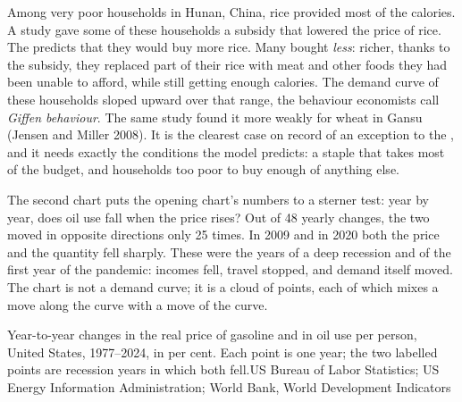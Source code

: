 \begin{record}
Among very poor households in Hunan, China, rice provided most of the calories. A study gave some of these households a
subsidy that lowered the price of rice. The  predicts that they would buy more rice. Many bought
\emph{less}: richer, thanks to the subsidy, they replaced part of their rice with meat and other foods they had been
unable to afford, while still getting enough calories. The demand curve of these households sloped upward over that
range, the behaviour economists call \emph{Giffen behaviour}. The same study found it more weakly for wheat in Gansu (Jensen and Miller 2008). It is the clearest case on record of an
exception to the , and it needs exactly the conditions the model predicts: a staple that takes most of the
budget, and households too poor to buy enough of anything else.
\end{record}

The second chart puts the opening chart's numbers to a sterner test: year by year, does oil use fall when the price
rises? Out of 48 yearly changes, the two moved in opposite directions only 25 times. In 2009 and in 2020 both the
price and the quantity fell sharply. These were the years of a deep recession and of the first year of the pandemic:
incomes fell, travel stopped, and demand itself moved. The chart is not a demand curve; it is a cloud of points, each of
which mixes a move along the curve with a move of the curve.

\begin{omchart}{Year-to-year changes in the real price of gasoline and in oil use per person, United States, 1977--2024,
in per cent. Each point is one year; the two labelled points are recession years in which both fell.}{US Bureau of Labor
Statistics; US Energy Information Administration; World Bank, World Development Indicators}
\end{omchart}

